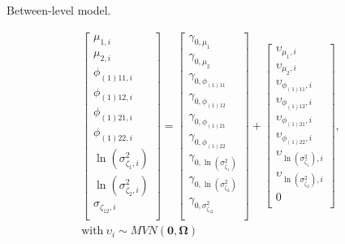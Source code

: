 \documentclass[
]{article}
\begin{document}
\begin{center} Between-level model. \end{center}

\[
\begin{gathered} \begin{bmatrix} \mu_{1,i}\\
\mu_{2,i}\\
\phi_{(1)11,i}\\
\phi_{(1)12,i}\\
\phi_{(1)21,i}\\
\phi_{(1)22,i}\\
\ln(\sigma^2_{\zeta_{1},i})\\
\ln(\sigma^2_{\zeta_{2},i})\\
\sigma_{\zeta_{12},i}\\ \end{bmatrix} = \begin{bmatrix} \gamma_{0,\mu_{1}}\\
\gamma_{0,\mu_{2}}\\
\gamma_{0,\phi_{(1)11}}\\
\gamma_{0,\phi_{(1)12}}\\
\gamma_{0,\phi_{(1)21}}\\
\gamma_{0,\phi_{(1)22}}\\
\gamma_{0,\ln(\sigma^2_{\zeta_{1}})}\\
\gamma_{0,\ln(\sigma^2_{\zeta_{2}})}\\
\gamma_{0,\sigma^2_{\zeta_{12}}}\\ \end{bmatrix} +
  \begin{bmatrix} \upsilon_{\mu_{1},i}\\
\upsilon_{\mu_{2},i}\\
\upsilon_{\phi_{(1)11},i}\\
\upsilon_{\phi_{(1)12},i}\\
\upsilon_{\phi_{(1)21},i}\\
\upsilon_{\phi_{(1)22},i}\\
\upsilon_{\ln(\sigma^2_{\zeta_{1}}),i}\\
\upsilon_{\ln(\sigma^2_{\zeta_{2}}),i}\\
0\\ \end{bmatrix} ,\\ 
\text{with}~
  \upsilon_{i} \sim \mathit{MVN}(\mathbf{0}, \mathbf{\Omega})  \end{gathered}
\] \vspace{1em}
\end{document}
